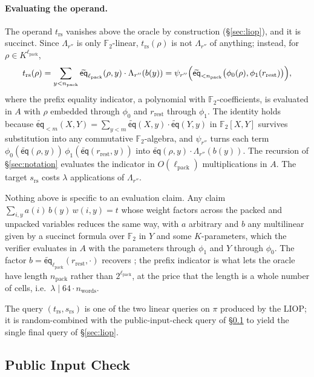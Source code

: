 \documentclass{article}
\theoremstyle{definition}
\newcommand*{\mle}{\widetilde}
\newcommand{\eq}{\mathsf{eq}}
\newcommand{\FF}[1]{\mathbb{F}_{#1}}
\begin{document}
\paragraph{Evaluating the operand.}
The operand $t_\text{rs}$ vanishes above the oracle by construction (\S\ref{sec:liop}), and it is succinct. Since $\Lambda_{r''}$ is only $\FF{2}$-linear, $t_\text{rs}(\rho)$ is not $\Lambda_{r''}$ of anything; instead, for $\rho \in K^{\ell_\text{pack}}$,
\[
  t_\text{rs}(\rho) = \sum_{y < n_\text{pack}} \mle{\eq}_{\ell_\text{pack}}(\rho, y) \cdot \Lambda_{r''}(b(y)) = \psi_{r''}\Bigl( \mle{\eq}_{< n_\text{pack}}\bigl( \phi_0(\rho), \phi_1(r_\text{rest}) \bigr) \Bigr),
\]
where the prefix equality indicator, a polynomial with $\FF{2}$-coefficients, is evaluated in $A$ with $\rho$ embedded through $\phi_0$ and $r_\text{rest}$ through $\phi_1$. The identity holds because $\mle{\eq}_{< m}(X, Y) = \sum_{y < m} \mle{\eq}(X, y) \cdot \mle{\eq}(Y, y)$ in $\FF{2}[X, Y]$ survives substitution into any commutative $\FF{2}$-algebra, and $\psi_{r''}$ turns each term $\phi_0(\mle{\eq}(\rho, y))\, \phi_1(\mle{\eq}(r_\text{rest}, y))$ into $\mle{\eq}(\rho, y) \cdot \Lambda_{r''}(b(y))$. The recursion of \S\ref{sec:notation} evaluates the indicator in $O(\ell_\text{pack})$ multiplications in $A$. The target $s_\text{rs}$ costs $\lambda$ applications of $\Lambda_{r''}$.

Nothing above is specific to an evaluation claim. Any claim $\sum_{i, y} a(i)\, b(y)\, w(i, y) = t$ whose weight factors across the packed and unpacked variables reduces the same way, with $a$ arbitrary and $b$ any multilinear given by a succinct formula over $\FF{2}$ in $Y$ and some $K$-parameters, which the verifier evaluates in $A$ with the parameters through $\phi_1$ and $Y$ through $\phi_0$. The factor $b = \mle{\eq}_{\ell_\text{pack}}(r_\text{rest}, \cdot)$ recovers \cite[Construction~3.1]{Diamond:2024ab}; the prefix indicator is what lets the oracle have length $n_\text{pack}$ rather than $2^{\ell_\text{pack}}$, at the price that the length is a whole number of cells, i.e.\ $\lambda \mid 64 \cdot n_\text{words}$.

The query $(t_\text{rs}, s_\text{rs})$ is one of the two linear queries on $\pi$ produced by the LIOP; it is random-combined with the public-input-check query of \S\ref{sec:public-input-check} to yield the single final query of \S\ref{sec:liop}.

\subsection{Public Input Check}
\label{sec:public-input-check}
\end{document}
